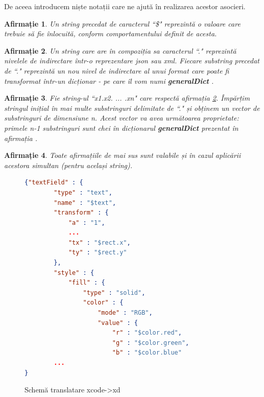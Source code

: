 De aceea introducem niște notații care ne ajută în realizarea acestor asocieri. 


\newtheorem{mydef}{Afirmație}[chapter]
\newtheorem{myNote}{Notă}[chapter]

\begin{mydef}\label{dollar}
Un string precedat de caracterul ``\$" reprezintă o valoare care trebuie să fie înlocuită, conform comportamentului definit de acesta.
\end{mydef}

\begin{mydef}\label{dot}
Un string care are în compoziția sa caracterul ``." reprezintă nivelele de indirectare într-o reprezentare json sau xml. Fiecare substring precedat de ``." reprezintă un nou nivel de indirectare al unui format care poate fi transformat într-un dicționar - pe care îl vom numi \textbf{generalDict} .
\end{mydef}

\begin{mydef}\label{count}
Fie string-ul ``x1.x2. ... .xn" care respectă afirmația \ref{dot}. Împărțim stringul inițial în mai multe substringuri delimitate de ``." și obținem un vector de substringuri de dimensiune n. Acest vector va avea următoarea proprietate: primele n-1 substringuri sunt chei în dicționarul \textbf{generalDict} prezentat în afirmația \label{dot}. 
\end{mydef}

\begin{mydef}
Toate afirmațiile de mai sus sunt valabile și în cazul aplicării acestora simultan (pentru același string).
\end{mydef}

\begin{figure}[!htbp]
\begin{lstlisting}[language=json,firstnumber=1]
{"textField" : {
        "type" : "text",
        "name" : "$text",
        "transform" : {
            "a" : "1",
            ...
            "tx" : "$rect.x",
            "ty" : "$rect.y"
        },
        "style" : {
            "fill" : {
                "type" : "solid",
                "color" : {
                    "mode" : "RGB",
                    "value" : {
                        "r" : "$color.red",
                        "g" : "$color.green",
                        "b" : "$color.blue"
        ...
}

\end{lstlisting}
\caption{Schemă translatare xcode->xd} \label{fig:XCode2XD Schema}
\end{figure}

